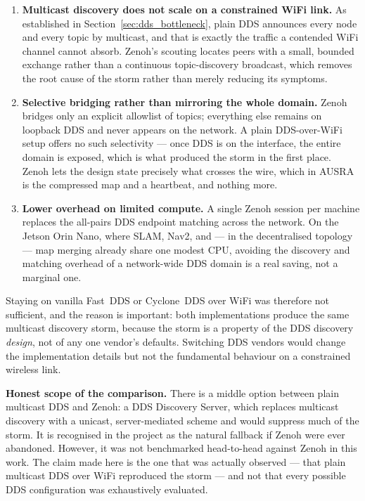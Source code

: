 \begin{enumerate}
    \item \textbf{Multicast discovery does not scale on a constrained WiFi link.} As established in Section~\ref{sec:dds_bottleneck}, plain DDS announces every node and every topic by multicast, and that is exactly the traffic a contended WiFi channel cannot absorb. Zenoh's scouting locates peers with a small, bounded exchange rather than a continuous topic-discovery broadcast, which removes the root cause of the storm rather than merely reducing its symptoms.
    \item \textbf{Selective bridging rather than mirroring the whole domain.} Zenoh bridges only an explicit allowlist of topics; everything else remains on loopback DDS and never appears on the network. A plain DDS-over-WiFi setup offers no such selectivity --- once DDS is on the interface, the entire domain is exposed, which is what produced the storm in the first place. Zenoh lets the design state precisely what crosses the wire, which in AUSRA is the compressed map and a heartbeat, and nothing more.
    \item \textbf{Lower overhead on limited compute.} A single Zenoh session per machine replaces the all-pairs DDS endpoint matching across the network. On the Jetson Orin Nano, where SLAM, Nav2, and --- in the decentralised topology --- map merging already share one modest CPU, avoiding the discovery and matching overhead of a network-wide DDS domain is a real saving, not a marginal one.
\end{enumerate}

Staying on vanilla Fast~DDS or Cyclone~DDS over WiFi was therefore not sufficient, and the reason is important: both implementations produce the same multicast discovery storm, because the storm is a property of the DDS discovery \emph{design}, not of any one vendor's defaults. Switching DDS vendors would change the implementation details but not the fundamental behaviour on a constrained wireless link.

\begin{notebox}
\textbf{Honest scope of the comparison.} There is a middle option between plain multicast DDS and Zenoh: a DDS Discovery Server, which replaces multicast discovery with a unicast, server-mediated scheme and would suppress much of the storm. It is recognised in the project as the natural fallback if Zenoh were ever abandoned. However, it was not benchmarked head-to-head against Zenoh in this work. The claim made here is the one that was actually observed --- that plain multicast DDS over WiFi reproduced the storm --- and not that every possible DDS configuration was exhaustively evaluated.
\end{notebox}

